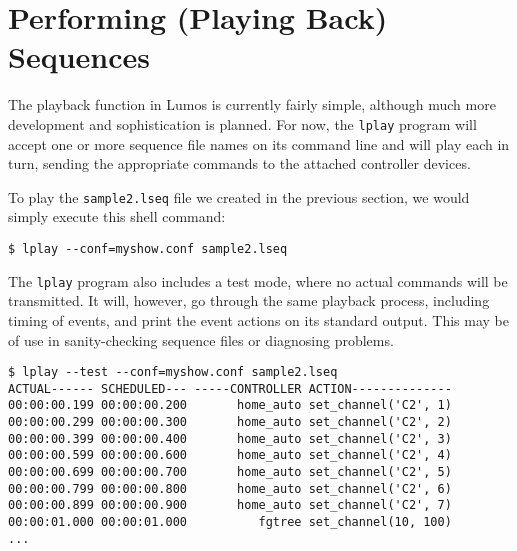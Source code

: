 \documentclass{article}
\begin{document}
\section{Performing (Playing Back) Sequences}
The playback function in Lumos is currently fairly simple, although much more
development and sophistication is planned.  For now, the {\tt lplay} program
will accept one or more sequence file names on its command line and will play
each in turn, sending the appropriate commands to the attached controller
devices.

To play the {\tt sample2.lseq} file we created in the previous section, we
would simply execute this shell command:
\begin{verbatim}
$ lplay --conf=myshow.conf sample2.lseq
\end{verbatim}

The {\tt lplay} program also includes a test mode, where no actual commands
will be transmitted.  It will, however, go through the same playback process,
including timing of events, and print the event actions on its standard
output.  This may be of use in sanity-checking sequence files or diagnosing
problems. 
\begin{verbatim}
$ lplay --test --conf=myshow.conf sample2.lseq
ACTUAL------ SCHEDULED--- -----CONTROLLER ACTION--------------
00:00:00.199 00:00:00.200       home_auto set_channel('C2', 1)
00:00:00.299 00:00:00.300       home_auto set_channel('C2', 2)
00:00:00.399 00:00:00.400       home_auto set_channel('C2', 3)
00:00:00.599 00:00:00.600       home_auto set_channel('C2', 4)
00:00:00.699 00:00:00.700       home_auto set_channel('C2', 5)
00:00:00.799 00:00:00.800       home_auto set_channel('C2', 6)
00:00:00.899 00:00:00.900       home_auto set_channel('C2', 7)
00:00:01.000 00:00:01.000          fgtree set_channel(10, 100)
...
\end{verbatim}
\end{document}

